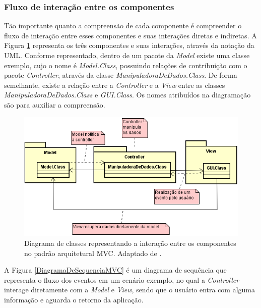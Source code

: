 \subsubsection{Fluxo de interação entre os componentes}

Tão importante quanto a compreensão de cada componente é compreender o fluxo de interação entre esses componentes e suas interações diretas e indiretas. A Figura \ref{DiagramaDeClasseMVC} representa os três componentes e suas interações, através da notação da UML. Conforme representado, dentro de um pacote da \textit{Model} existe uma classe exemplo, cujo o nome é \textit{Model.Class}, possuindo relações de contribuição com o pacote \textit{Controller}, através da classe \textit{ManipuladoraDeDados.Class}. De forma semelhante, existe a relação entre a \textit{Controller} e a \textit{View} entre as classes  \textit{ManipuladoraDeDados.Class} e \textit{GUI.Class}. Os nomes atribuídos na diagramação são para auxiliar a compreensão. 

\begin{figure}[h!]
	\centering
	\includegraphics[keepaspectratio=true,scale=0.9]{figuras/DiagramaDeClasseMVC.PNG}
	\caption{Diagrama de classes representando a interação entre os componentes no padrão arquitetural MVC. Adaptado de \cite{durelli2008proposta}.}
	\label{DiagramaDeClasseMVC}
\end{figure}

\pagebreak

A Figura \ref{DiagramaDeSequenciaMVC} é um diagrama de sequência que representa o fluxo dos eventos em um cenário exemplo, no qual a \textit{Controller} interage diretamente com a \textit{Model} e \textit{View}, sendo que o usuário entra com alguma informação e aguarda o retorno da aplicação. 


